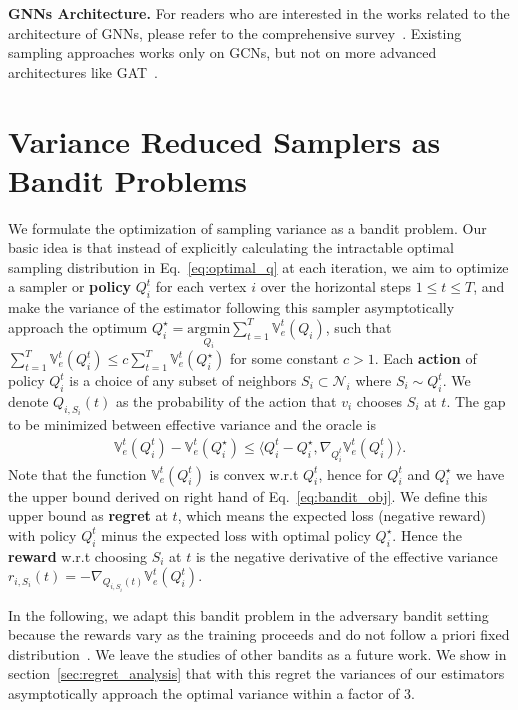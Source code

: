 \documentclass{article}
\begin{document}
{\bfseries GNNs Architecture.} 
For readers who are interested in the works related to the architecture of GNNs, please refer to
the comprehensive survey~\cite{wu2019comprehensive}.
Existing sampling approaches works only on GCNs, but
not on more advanced architectures like GAT~\cite{velivckovic2017graph}.

\section{Variance Reduced Samplers as Bandit Problems}\label{sec:problem}
We formulate the optimization of
sampling variance as a 
bandit problem. Our basic idea is that instead of 
explicitly calculating the intractable
optimal sampling distribution in Eq.~\eqref{eq:optimal_q} 
at each iteration, 
we aim to optimize a sampler or \textbf{policy} $Q_i^t$ for each vertex
$i$ over the horizontal steps $1\leq t \leq T$, and make the
variance of the estimator following this sampler
asymptotically approach the optimum 
$Q_{i}^{\star}=\underset{Q_i}{\mathrm{argmin}}\sum_{t=1}^{T}\mathbb{V}_{e}^{t}(Q_i)$,
such that 
$\sum_{t=1}^{T}\mathbb{V}_e^t(Q_i^t) \leq c\sum_{t=1}^{T}\mathbb{V}_e^t(Q_i^{\star})$ 
for some constant $c>1$. 
Each \textbf{action} of policy $Q_i^t$ is a choice of any 
subset of neighbors 
$S_i \subset \mathcal{N}_i$ where $S_i \sim Q_i^t$.
We denote $Q_{i,S_i}(t)$ as the probability 
of the action that $v_i$ chooses $S_i$ at $t$.
The gap to be minimized between
effective variance and the oracle is
\begin{align}\label{eq:bandit_obj}
\mathbb{V}_e^t(Q_i^t) - \mathbb{V}_e^t(Q_i^{\star}) \leq \langle Q_i^t - Q_i^{\star}, 
\nabla_{Q_i^t}\mathbb{V}_e^t(Q_i^t) \rangle.
\end{align}
Note that the function 
$\mathbb{V}_e^t(Q_i^t)$ is convex w.r.t
$Q_i^t$, hence for $Q_i^t$ and $Q_i^{\star}$ we have the 
upper bound derived on right hand of Eq.~\eqref{eq:bandit_obj}.
We define this upper bound as \textbf{regret} at $t$,
which means the expected loss (negative
reward) with policy $Q_i^t$ minus the expected loss with
optimal policy $Q_i^{\star}$. 
Hence the \textbf{reward} 
w.r.t choosing $S_i$ at $t$ is the negative 
derivative of the effective variance
$r_{i,S_i}(t)=-\nabla_{Q_{i,S_i}(t)}\mathbb{V}_e^t(Q_i^t)$.

In the following, we adapt this bandit problem in the adversary bandit 
setting~\cite{auer2002nonstochastic} because the rewards
vary as the training proceeds and do not follow a priori
fixed distribution~\cite{burtini2015survey}. We leave the
studies of other bandits as a future work.
We show in section~\ref{sec:regret_analysis} that 
with this regret the variances of our estimators 
asymptotically approach the optimal 
variance within a factor of $3$.
\end{document}
